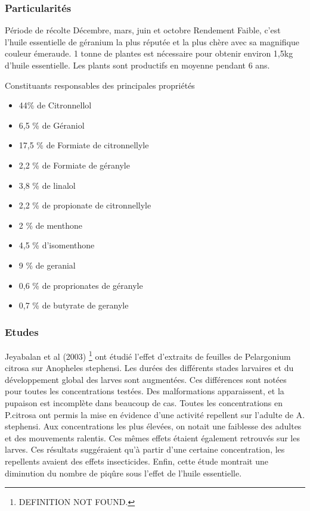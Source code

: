 \documentclass[12pt,a4wide]{article}
\begin{document}
\subsubsection{Particularités}
\label{sec-4-6-3}
Période de récolte
Décembre, mars, juin et octobre
Rendement
Faible, c'est l'huile essentielle de géranium la plus réputée et la plus chère avec sa magnifique couleur émeraude. 1 tonne de plantes est nécessaire pour obtenir environ 1,5kg d'huile essentielle.
Les plants sont productifs en moyenne pendant 6 ans.

Constituants responsables des principales propriétés
\begin{itemize}
\item 44\% de Citronnellol
\item 6,5 \% de Géraniol
\item 17,5 \% de Formiate de citronnellyle
\item 2,2 \% de Formiate de géranyle
\item 3,8 \% de linalol
\item 2,2 \% de propionate de citronnellyle
\item 2 \% de menthone
\item 4,5 \% d'isomenthone
\item 9 \% de geranial
\item 0,6 \% de proprionates de géranyle
\item 0,7 \% de butyrate de geranyle
\end{itemize}

\subsubsection{Etudes}
\label{sec-4-6-4}

Jeyabalan et al (2003) \footnote{DEFINITION NOT FOUND.} ont étudié l'effet d'extraits de feuilles de Pelargonium citrosa sur Anopheles stephensi. Les durées des différents stades larvaires et du développement global des larves sont augmentées. Ces différences sont notées pour toutes les concentrations testées. Des malformations apparaissent, et la pupaison est incomplète dans beaucoup de cas. 
Toutes les concentrations en P.citrosa ont permis la mise en évidence d'une activité repellent sur l'adulte de A. stephensi. Aux concentrations les plus élevées, on notait une faiblesse des adultes et des mouvements ralentis. Ces mêmes effets étaient également retrouvés sur les larves. Ces résultats suggéraient qu'à partir d'une certaine concentration, les repellents avaient des effets insecticides. 
Enfin, cette étude montrait une diminution du nombre de piqûre sous l'effet de l'huile essentielle. 
\end{document}
